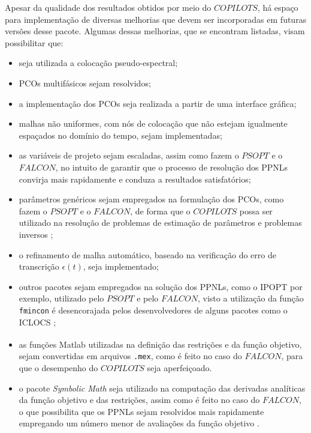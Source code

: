 Apesar da qualidade dos resultados obtidos por meio do $ COPILOTS $, há espaço para implementação de diversas melhorias que devem ser incorporadas em futuras versões desse pacote. Algumas dessas melhorias, que se encontram listadas, visam possibilitar que:
%
\begin{itemize}
	\item seja utilizada a colocação pseudo-espectral;
	\item PCOs multifásicos sejam resolvidos;
	\item a implementação dos PCOs seja realizada a partir de uma interface gráfica;
	\item malhas não uniformes, com nós de colocação que não estejam igualmente espaçados no domínio do tempo, sejam implementadas;
	\item as variáveis de projeto sejam escaladas, assim como fazem o $ PSOPT $ e o $ FALCON $, no intuito de garantir que o processo de resolução dos PPNLs convirja mais rapidamente e conduza a resultados satisfatórios; 
	\item parâmetros genéricos sejam empregados na formulação dos PCOs, como fazem o $ PSOPT $ e o $ FALCON $, de forma que o $ COPILOTS $ possa ser utilizado na resolução de problemas de estimação de parâmetros e problemas inversos \cite{tarantola_inverse_2005}; 
	\item o refinamento de malha automático, baseado na verificação do erro de transcrição $ \epsilon(t) $, seja implementado;
	\item outros pacotes sejam empregados na solução dos PPNLs, como o IPOPT \cite{wachter_implementation_2006} por exemplo, utilizado pelo $ PSOPT $ e pelo $ FALCON $, visto a utilização da função \texttt{fmincon} é desencorajada pelos desenvolvedores de alguns pacotes como o ICLOCS \cite{falugi_iclocs2_2018};
	\item as funções Matlab\textsuperscript{\textregistered} utilizadas na definição das restrições e da função objetivo, sejam convertidas em arquivos \texttt{.mex}, como é feito no caso do $ FALCON $, para que o desempenho do $ COPILOTS $ seja aperfeiçoado. 
	\item o pacote \textit{Symbolic Math} \cite{mathworks_symbolic_2016} seja utilizado na computação das derivadas analíticas da função objetivo e das restrições, assim como é feito no caso do $ FALCON $, o que possibilita que os PPNLs sejam resolvidos mais rapidamente empregando um número menor de avaliações da função objetivo \cite{betts_practical_2001}. 
\end{itemize}


